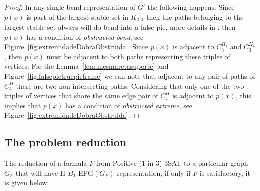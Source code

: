 \documentclass[a4paper,11pt]{article}
\begin{document}
\begin{proof}
In any single bend representation of $ G'$ the following happens. Since $ p(x) $ is part of the largest stable set in $ K_{2,4} $ then the paths belonging to the largest stable set always will do bend into a false pie, more details in \citep{Asinowski2009}, then $ p(x) $ has a condition of \emph {obstructed bend}, see Figure~\ref{fig:extremidadeDobraObstruida}. Since $ p(x) $ is adjacent to $ C_{3}^{H_1}$ and $ C_3^{H_2}$, then $ p(x) $ must be adjacent to both paths representing these triples of vertices. For the Lemma~\ref{lem:mesmaretasuporte} and Figure~\ref{fig:falsepietruepieframe} we can note that adjacent to any pair of paths of $ C_4^H $ there are two non-intersecting paths. Considering that only one of the two triples of vertices that share the same edge pair of $ C_4^H $ is adjacent to $ p(x) $, this implies that $ p(x) $ has a condition of \emph{obstructed extreme}, see Figure~\ref{fig:extremidadeDobraObstruida}.
\end{proof}


\subsection{The problem reduction}\label{sec:reducao}

The reduction of a formula $F$ from  {\sc Positive (1 in 3)-3SAT}  to a particular graph $G_F$ that will have  H-$B_{1}$-EPG$(G_F)$ representation, if only if $F$ is satisfactory, it is given below.
\end{document}
